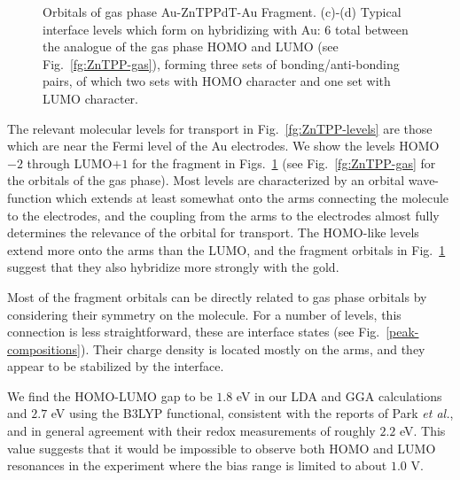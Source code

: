 \documentclass[aip,jcp,a4paper,reprint,floatfix,superscriptaddress]{revtex4-1}
\newcommand{\etal}{\emph{et al.}\xspace}
\begin{document}
\begin{figure}
\caption{Orbitals of gas phase Au-ZnTPPdT-Au Fragment. (c)-(d) Typical interface levels which form on hybridizing with Au: 6 total between the analogue of the gas phase HOMO and LUMO (see Fig.~\ref{fg:ZnTPP-gas}), forming three sets of bonding/anti-bonding pairs, of which two sets with HOMO character and one set with LUMO character.}\label{fg:ZnTPP-frag}
\end{figure}


The relevant molecular levels for transport in Fig.~\ref{fg:ZnTPP-levels} are those which are near the Fermi level of the Au electrodes. We show the levels HOMO$-2$ through LUMO$+1$ for the fragment in Figs.~\ref{fg:ZnTPP-frag} (see Fig.~\ref{fg:ZnTPP-gas} for the orbitals of the gas phase). Most levels are characterized by an orbital wave-function which extends at least somewhat onto the arms connecting the molecule to the electrodes, and the coupling from the arms to the electrodes almost fully determines the relevance of the orbital for transport. The HOMO-like levels extend more onto the arms than the LUMO, and the fragment orbitals in Fig.~\ref{fg:ZnTPP-frag} suggest that they also hybridize more strongly with the gold.

Most of the fragment orbitals can be directly related to gas phase orbitals by considering their symmetry on the molecule. For a  number of levels, this connection is less straightforward, these are interface states (see Fig.~\ref{peak-compositions}).  
Their charge density is located mostly on the arms, and they appear to be stabilized by the interface.  

We find  the HOMO-LUMO gap to be $1.8$ eV in our LDA and GGA calculations and $2.7$ eV using the B3LYP functional, consistent with the reports of Park \etal\cite{Park2008}, and in general agreement with their redox measurements of roughly $2.2$ eV. This value suggests that it would be impossible to observe both HOMO and LUMO resonances in the experiment where the bias range is limited to about $1.0$ V.
\end{document}
